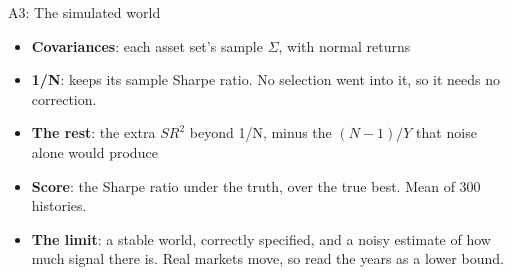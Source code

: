 \documentclass[aspectratio=169,10pt]{beamer}
\begin{document}
\begin{frame}[label=appendix_world]{A3: The simulated world}
\begin{itemize}
\item \textbf{Covariances}: each asset set's sample $\Sigma$, with normal returns
\vskip 7pt
\item \textbf{1/N}: keeps its sample Sharpe ratio. No selection went into it, so it needs no correction.
\vskip 7pt
\item \textbf{The rest}: the extra $SR^{2}$ beyond 1/N, minus the $(N-1)/Y$ that noise alone would produce
\vskip 7pt
\item \textbf{Score}: the Sharpe ratio under the truth, over the true best. Mean of 300 histories.
\vskip 7pt
\item \textbf{The limit}: a stable world, correctly specified, and a noisy estimate of how much signal there is. Real markets move, so read the years as a lower bound.
\end{itemize}
\hfill \hyperlink{appendix_world_back}{}
\end{frame}
\end{document}
